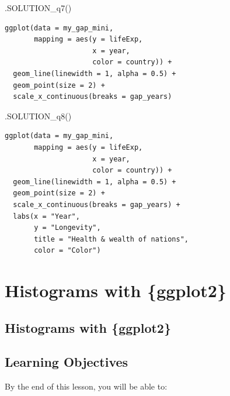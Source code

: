 \documentclass[
  letterpaper,
  DIV=11,
  numbers=noendperiod]{scrreprt}
\newenvironment{Shaded}{\begin{snugshade}}{\end{snugshade}}
\newcommand{\FunctionTok}[1]{\textcolor[rgb]{0.28,0.35,0.67}{#1}}
\newcommand{\NormalTok}[1]{\textcolor[rgb]{0.00,0.23,0.31}{#1}}
\begin{document}
\begin{Shaded}
\begin{Highlighting}[]
\FunctionTok{.SOLUTION\_q7}\NormalTok{()}
\end{Highlighting}
\end{Shaded}

\begin{verbatim}
ggplot(data = my_gap_mini, 
       mapping = aes(y = lifeExp, 
                     x = year, 
                     color = country)) +
  geom_line(linewidth = 1, alpha = 0.5) +
  geom_point(size = 2) +
  scale_x_continuous(breaks = gap_years)
\end{verbatim}

\begin{Shaded}
\begin{Highlighting}[]
\FunctionTok{.SOLUTION\_q8}\NormalTok{()}
\end{Highlighting}
\end{Shaded}

\begin{verbatim}
ggplot(data = my_gap_mini, 
       mapping = aes(y = lifeExp, 
                     x = year, 
                     color = country)) +
  geom_line(linewidth = 1, alpha = 0.5) +
  geom_point(size = 2) +
  scale_x_continuous(breaks = gap_years) +
  labs(x = "Year", 
       y = "Longevity",
       title = "Health & wealth of nations",
       color = "Color")
\end{verbatim}


\hypertarget{histograms-with-ggplot2}{%
\chapter{Histograms with \{ggplot2\}}\label{histograms-with-ggplot2}}

\hypertarget{histograms-with-ggplot2-1}{%
\section{Histograms with \{ggplot2\}}\label{histograms-with-ggplot2-1}}

\hypertarget{learning-objectives-3}{%
\section{Learning Objectives}\label{learning-objectives-3}}

By the end of this lesson, you will be able to:
\end{document}
